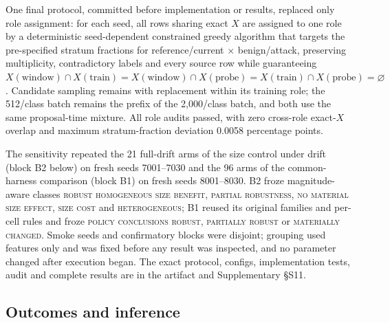 \documentclass[journal]{IEEEtran}
\begin{document}
One final protocol, committed before implementation or results, replaced only role assignment: for each seed, all rows sharing exact $X$ are assigned to one role by a deterministic seed-dependent constrained greedy algorithm that targets the pre-specified stratum fractions for reference/current $\times$ benign/attack, preserving multiplicity, contradictory labels and every source row while guaranteeing $X(\mathrm{window})\cap X(\mathrm{train})=X(\mathrm{window})\cap X(\mathrm{probe})=X(\mathrm{train})\cap X(\mathrm{probe})=\varnothing$. Candidate sampling remains with replacement within its training role; the 512/class batch remains the prefix of the 2{,}000/class batch, and both use the same proposal-time mixture. All role audits passed, with zero cross-role exact-$X$ overlap and maximum stratum-fraction deviation 0.0058 percentage points.

The sensitivity repeated the 21 full-drift arms of the size control under drift (block B2 below) on fresh seeds 7001--7030 and the 96 arms of the common-harness comparison (block B1) on fresh seeds 8001--8030. B2 froze magnitude-aware classes \textsc{robust homogeneous size benefit}, \textsc{partial robustness}, \textsc{no material size effect}, \textsc{size cost} and \textsc{heterogeneous}; B1 reused its original families and per-cell rules and froze \textsc{policy conclusions robust}, \textsc{partially robust} or \textsc{materially changed}. Smoke seeds and confirmatory blocks were disjoint; grouping used features only and was fixed before any result was inspected, and no parameter changed after execution began. The exact protocol, configs, implementation tests, audit and complete results are in the artifact and Supplementary \S S11.

\subsection{Outcomes and inference}
\label{sec:outcomes}
\end{document}
